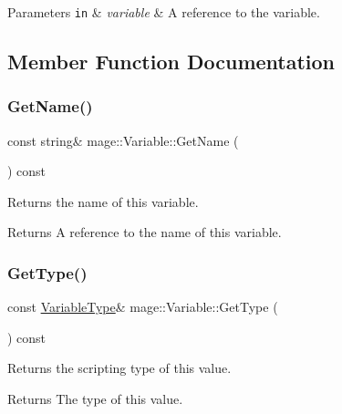 \begin{DoxyParams}[1]{Parameters}
\mbox{\tt in}  & {\em variable} & A reference to the variable. \\
\hline
\end{DoxyParams}


\subsection{Member Function Documentation}
\hypertarget{structmage_1_1_variable_a7f70fdadf34cdf6b26adc9910eade11d}{}\label{structmage_1_1_variable_a7f70fdadf34cdf6b26adc9910eade11d} 
\subsubsection{\texorpdfstring{Get\+Name()}{GetName()}}
{\footnotesize\ttfamily const string\& mage\+::\+Variable\+::\+Get\+Name (\begin{DoxyParamCaption}{ }\end{DoxyParamCaption}) const}

Returns the name of this variable.

\begin{DoxyReturn}{Returns}
A reference to the name of this variable. 
\end{DoxyReturn}
\hypertarget{structmage_1_1_variable_a5265e80b2a1c280fad5886174dfc997a}{}\label{structmage_1_1_variable_a5265e80b2a1c280fad5886174dfc997a} 
\subsubsection{\texorpdfstring{Get\+Type()}{GetType()}}
{\footnotesize\ttfamily const \hyperlink{namespacemage_a530428e73bac0ba7fe84b29086a9e33a}{Variable\+Type}\& mage\+::\+Variable\+::\+Get\+Type (\begin{DoxyParamCaption}{ }\end{DoxyParamCaption}) const}

Returns the scripting type of this value.

\begin{DoxyReturn}{Returns}
The type of this value. 
\end{DoxyReturn}
\hypertarget{structmage_1_1_variable_a65ecc95bcdc26733394d3a32d3d698f1}{}\label{structmage_1_1_variable_a65ecc95bcdc26733394d3a32d3d698f1} 
